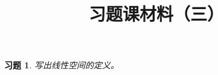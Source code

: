 \documentclass[UTF8]{ctexart}
\newtheorem{ex}[thm]{习题}
\begin{document}
\title{习题课材料（三）}

\date{}

\maketitle

\vspace{-1cm}









	
\begin{ex}
写出线性空间的定义。
\end{ex}
\end{document}
